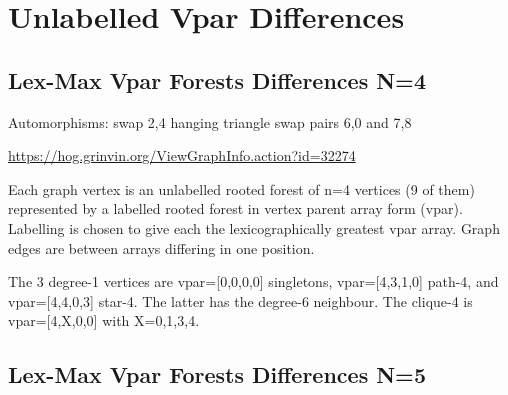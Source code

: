\documentclass{article}
\begin{document}
\section{Unlabelled Vpar Differences}

\subsection{Lex-Max Vpar Forests Differences N=4}


Automorphisms: \newline
swap 2,4 hanging triangle \newline
swap pairs 6,0 and 7,8

\url{https://hog.grinvin.org/ViewGraphInfo.action?id=32274}

Each graph vertex is an unlabelled rooted forest of n=4 vertices (9 of
them) represented by a labelled rooted forest in vertex parent array
form (vpar).  Labelling is chosen to give each the lexicographically
greatest vpar array.  Graph edges are between arrays differing in one
position.

The 3 degree-1 vertices are vpar=[0,0,0,0] singletons, vpar=[4,3,1,0]
path-4, and vpar=[4,4,0,3] star-4.  The latter has the degree-6
neighbour.  The clique-4 is vpar=[4,X,0,0] with X=0,1,3,4.


\begin{center}
\end{center}

\subsection{Lex-Max Vpar Forests Differences N=5}
\end{document}
